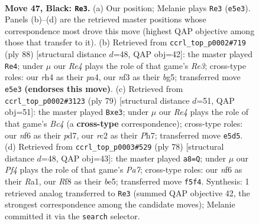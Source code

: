 \documentclass[11pt]{article}
\begin{document}
\clearpage

\begin{figure}[p]\centering
\begin{subfigure}{0.46\textwidth}\centering
\resizebox{\linewidth}{!}{%
\newchessgame
\chessboard[
  setfen={1k3r2/8/5N2/1b1Brp2/1P5R/5N2/2R3P1/3K4 b - - 10 47},
  showmover=false,
  pgfstyle=straightmove, color=movearrow, markmove={e5-e3}
]}
\caption{}
\end{subfigure}\hfill
\begin{subfigure}{0.46\textwidth}\centering
\resizebox{\linewidth}{!}{%
\newchessgame
\chessboard[
  setfen={6k1/1p4p1/3rn3/6b1/p7/P3R3/2B5/5R1K w - - 1 45},
  showmover=false,
  pgfstyle=straightmove, color=movearrow, markmove={e3-e4}
]}
\caption{}
\end{subfigure}
\\[4pt]
\begin{subfigure}{0.46\textwidth}\centering
\resizebox{\linewidth}{!}{%
\newchessgame
\chessboard[
  setfen={3r3k/3P3p/8/2b1pP2/2R5/1rp1N3/6KP/4R3 b - - 4 40},
  showmover=false,
  pgfstyle=straightmove, color=movearrow, markmove={c5-e3}
]}
\caption{}
\end{subfigure}\hfill
\begin{subfigure}{0.46\textwidth}\centering
\resizebox{\linewidth}{!}{%
\newchessgame
\chessboard[
  setfen={6rk/P4R1p/5p2/4b1n1/8/8/6P1/R5K1 w - - 5 40},
  showmover=false,
  pgfstyle=straightmove, color=movearrow, markmove={a7-a8}
]}
\caption{}
\end{subfigure}
\caption{\textbf{Move 47, Black: \texttt{Re3}.} (a) Our position; Melanie plays \texttt{Re3} (\texttt{e5e3}). Panels (b)--(d) are the retrieved master positions whose correspondence most drove this move (highest QAP objective among those that transfer to it). (b) Retrieved from \texttt{ccrl\_top\_p0002\#719} (ply 88) [structural distance $d$=48, QAP obj=42]: the master played \texttt{Re4}; under $\mu$ our \emph{Re4} plays the role of that game's \emph{Re3}; cross-type roles: our \emph{r}h4 as their \emph{p}a4, our \emph{n}f3 as their \emph{b}g5; transferred move \texttt{e5e3} \textbf{(endorses this move)}. (c) Retrieved from \texttt{ccrl\_top\_p0002\#3123} (ply 79) [structural distance $d$=51, QAP obj=51]: the master played \texttt{Bxe3}; under $\mu$ our \emph{Re4} plays the role of that game's \emph{Bc4} (a \textbf{cross-type} correspondence); cross-type roles: our \emph{n}f6 as their \emph{p}d7, our \emph{r}c2 as their \emph{P}h7; transferred move \texttt{e5d5}. (d) Retrieved from \texttt{ccrl\_top\_p0003\#529} (ply 78) [structural distance $d$=48, QAP obj=43]: the master played \texttt{a8=Q}; under $\mu$ our \emph{Pf4} plays the role of that game's \emph{Pa7}; cross-type roles: our \emph{n}f6 as their \emph{R}a1, our \emph{R}f8 as their \emph{b}e5; transferred move \texttt{f5f4}. Synthesis: 1 retrieved analog transferred to \texttt{Re3} (summed QAP objective 42, the strongest correspondence among the candidate moves); Melanie committed it via the \texttt{search} selector.}
\label{fig:thought-m93}
\end{figure}
\end{document}
